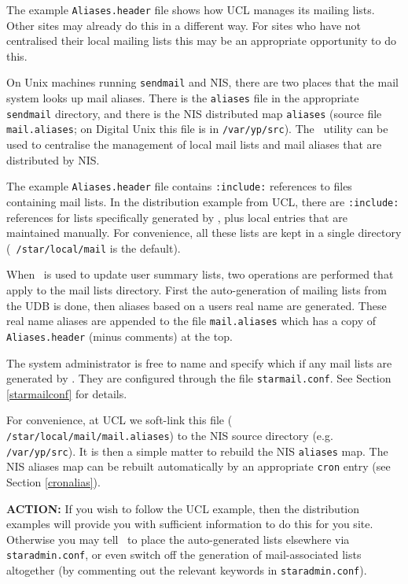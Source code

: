 The example {\tt Aliases.header} file shows how UCL manages its mailing
lists. Other sites may already do this in a different way. For sites who
have not centralised their local mailing lists this may be an appropriate
opportunity to do this. 

On Unix machines running {\tt sendmail} and NIS, there are two places that
the mail system looks up mail aliases. There is the {\tt aliases} file in
the appropriate {\tt sendmail} directory, and there is the NIS distributed
map {\tt aliases} (source file {\tt mail.aliases}; on Digital Unix this
file is in {\tt /var/yp/src}). The \staradmin\ utility can be used to
centralise the management of local mail lists and mail aliases that are
distributed by NIS. 

The example {\tt Aliases.header} file contains {\tt :include:} references
to files containing mail lists. In the distribution example from UCL,
there are {\tt :include:} references for lists specifically generated by
\staradmin, plus local entries that are maintained manually. For
convenience, all these lists are kept in a single directory ({\tt
/star/local/mail} is the default). 

When \staradmin\ is used to update user summary lists, two operations are
performed that apply to the mail lists directory. First the
auto-generation of mailing lists from the UDB is done, then aliases based
on a users real name are generated. These real name aliases are appended
to the file {\tt mail.aliases} which has a copy of {\tt Aliases.header}
(minus comments) at the top. 

The system administrator is free to name and specify which if any mail
lists are generated by \staradmin. They are configured through the file
{\tt starmail.conf}. See Section \ref{starmailconf} for details. 

For convenience, at UCL we soft-link this file ({\tt
/star/local/mail/mail.aliases}) to the NIS source directory (e.g. {\tt
/var/yp/src}). It is then a simple matter to rebuild the NIS {\tt aliases}
map. The NIS aliases map can be rebuilt automatically by an appropriate
{\tt cron} entry (see Section \ref{cronalias}). 

{\large\bf ACTION:} If you wish to follow the UCL example, then the
distribution examples will provide you with sufficient information to do
this for you site. Otherwise you may tell \staradmin\ to place the
auto-generated lists elsewhere via {\tt staradmin.conf}, or even switch
off the generation of mail-associated lists altogether (by commenting out
the relevant keywords in {\tt staradmin.conf}). 

